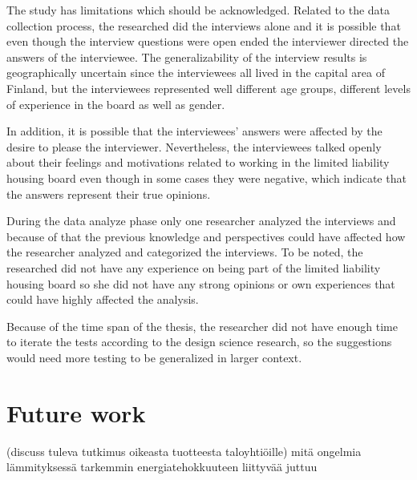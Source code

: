 The study has limitations which should be acknowledged. Related to the data collection process, the researched did the interviews alone and it is possible that even though the interview questions were open ended the interviewer directed the answers of the interviewee. The generalizability of the interview results is geographically uncertain since the interviewees all lived in the capital area of Finland, but the interviewees represented well different age groups, different levels of experience in the board as well as gender.

In addition, it is possible that the interviewees' answers were affected by the desire to please the interviewer. Nevertheless, the interviewees talked openly about their feelings and motivations related to working in the limited liability housing board even though in some cases they were negative, which indicate that the answers represent their true opinions. 

During the data analyze phase only one researcher analyzed the interviews and because of that the previous knowledge and perspectives could have affected how the researcher analyzed and categorized the interviews. To be noted, the researched did not have any experience on being part of the limited liability housing board so she did not have any strong opinions or own experiences that could have highly affected the analysis.

Because of the time span of the thesis, the researcher did not have enough time to iterate the tests according to the design science research, so the suggestions would need more testing to be generalized in larger context.

\section{Future work}
(discuss tuleva tutkimus oikeasta tuotteesta taloyhtiöille)
mitä ongelmia lämmityksessä
tarkemmin energiatehokkuuteen liittyvää juttuu